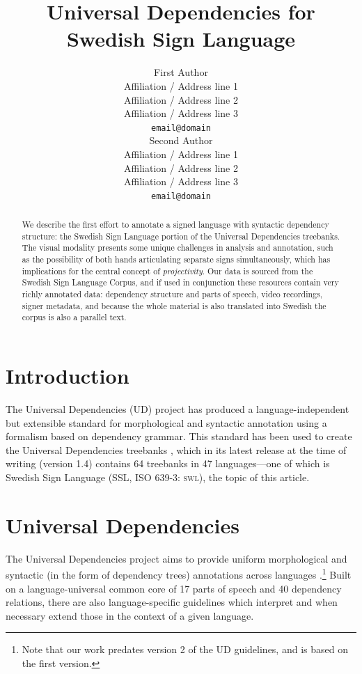 \documentclass[11pt]{article}
\title{Universal Dependencies for Swedish Sign Language}
\author{First Author \\
  Affiliation / Address line 1 \\
  Affiliation / Address line 2 \\
  Affiliation / Address line 3 \\
  {\tt email@domain} \\\And
  Second Author \\
  Affiliation / Address line 1 \\
  Affiliation / Address line 2 \\
  Affiliation / Address line 3 \\
  {\tt email@domain} \\}
\date{}
\begin{document}
\maketitle
\begin{abstract}
    We describe the first effort to annotate a signed language with syntactic
    dependency structure: the Swedish Sign Language portion of the
    Universal Dependencies treebanks.
    The visual modality presents some unique challenges in analysis and
    annotation, such as the possibility of
    both hands articulating separate signs simultaneously, which has
    implications for the central concept of \emph{projectivity}.
    Our data is sourced from the Swedish Sign Language Corpus,
    and if used in conjunction these resources contain very richly
    annotated data: dependency structure and parts of speech,
    video recordings, signer metadata, and because the whole material is
    also translated into Swedish the corpus is also a parallel text.
\end{abstract}

\section{Introduction}

The Universal Dependencies (UD) project \cite{Nivre2016ud} 
has produced a language-independent but extensible standard for
morphological and syntactic annotation using a formalism based on
dependency grammar. This standard has been used to create the Universal
Dependencies treebanks \cite{ud14}, which in its latest release at the time of
writing (version 1.4) contains 64 treebanks in 47 languages---one of which is
Swedish Sign Language (SSL, ISO 639-3: \textsc{swl}), the topic of this
article.


\section{Universal Dependencies}

The Universal Dependencies project aims to provide uniform morphological and
syntactic (in the form of dependency trees) annotations across languages
\cite{Nivre2016ud}.\footnote{Note that our work predates version 2 of the UD
guidelines, and is based on the first version.}
Built on a language-universal common core of 17 parts of speech and
40 dependency relations, there are also language-specific guidelines which
interpret and when necessary extend those in the context of a given language.
\end{document}
